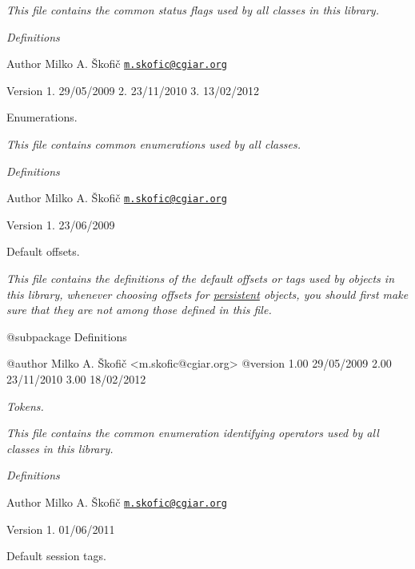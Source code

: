 {\itshape This file contains the common status flags used by all classes in this library.}

{\itshape  Definitions}

{\itshape \begin{DoxyAuthor}{Author}
Milko A. Škofič \href{mailto:m.skofic@cgiar.org}{\tt m.\-skofic@cgiar.\-org} 
\end{DoxyAuthor}
\begin{DoxyVersion}{Version}
1. 29/05/2009 2. 23/11/2010 3. 13/02/2012
\end{DoxyVersion}
Enumerations.}

{\itshape This file contains common enumerations used by all classes.}

{\itshape  Definitions}

{\itshape \begin{DoxyAuthor}{Author}
Milko A. Škofič \href{mailto:m.skofic@cgiar.org}{\tt m.\-skofic@cgiar.\-org} 
\end{DoxyAuthor}
\begin{DoxyVersion}{Version}
1. 23/06/2009
\end{DoxyVersion}
\begin{DoxyVerb} Default offsets.
\end{DoxyVerb}
}

{\itshape This file contains the definitions of the default offsets or tags used by objects in this library, whenever choosing offsets for \hyperlink{class_c_persistent_object}{persistent} objects, you should first make sure that they are not among those defined in this file.}

{\itshape \begin{DoxyVerb} @subpackage        Definitions

 @author            Milko A. Škofič <m.skofic@cgiar.org>
 @version   1.00 29/05/2009
                    2.00 23/11/2010
                    3.00 18/02/2012\end{DoxyVerb}
}

{\itshape Tokens.}

{\itshape This file contains the common enumeration identifying operators used by all classes in this library.}

{\itshape  Definitions}

{\itshape \begin{DoxyAuthor}{Author}
Milko A. Škofič \href{mailto:m.skofic@cgiar.org}{\tt m.\-skofic@cgiar.\-org} 
\end{DoxyAuthor}
\begin{DoxyVersion}{Version}
1. 01/06/2011
\end{DoxyVersion}
Default session tags.}

